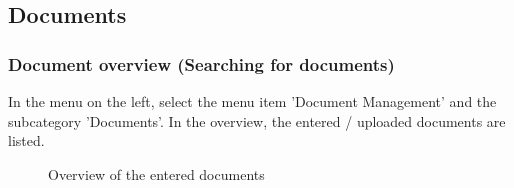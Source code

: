 \subsection{Documents}
\label{bkm:Ref442273482}

\subsubsection{Document overview (Searching for documents)}
\label{bkm:Ref443047823}

In the menu on the left, select the menu item 'Document Management' and the subcategory 'Documents'. In the overview, the entered / uploaded documents are listed.

\begin{figure}[H]
\caption{Overview of the entered documents}
\end{figure}

